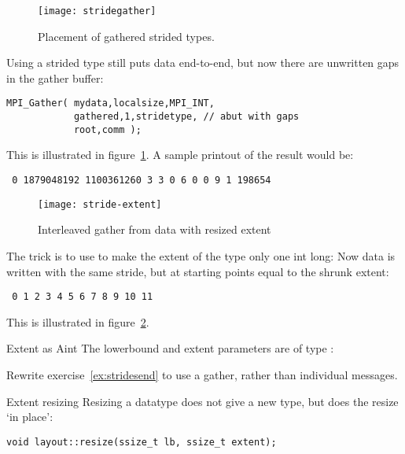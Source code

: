 \begin{figure}
  \texttt{[image: stridegather]}
  \caption{Placement of gathered strided types.}
  \label{fig:stridegather}
\end{figure}
Using a strided type still puts data end-to-end, but now there
are unwritten gaps in the gather buffer:
\begin{lstlisting}
MPI_Gather( mydata,localsize,MPI_INT,
            gathered,1,stridetype, // abut with gaps
            root,comm );  
\end{lstlisting}
This is illustrated in figure~\ref{fig:stridegather}.
A sample printout of the result would be:
\begin{verbatim}
 0 1879048192 1100361260 3 3 0 6 0 0 9 1 198654
\end{verbatim}

\begin{figure}[ht]
  \texttt{[image: stride-extent]}
  \caption{Interleaved gather from data with resized extent}
  \label{fig:stride-extent}
\end{figure}

The trick is to use 
to make the extent of the type only one int long:
%
%
Now data is written with the same stride, but
at starting points equal to the shrunk extent:
\begin{verbatim}
 0 1 2 3 4 5 6 7 8 9 10 11
\end{verbatim}

This is illustrated in figure~\ref{fig:stride-extent}.

\begin{fortrannote}{Extent as Aint}
  The lowerbound and extent parameters are of type
  :
\end{fortrannote}

\begin{exercise}[stridesend]
  \label{ex:stridesendsized}
  Rewrite exercise~\ref{ex:stridesend} to use a gather,
  rather than individual messages.
\end{exercise}

\begin{mplnote}{Extent resizing}
  Resizing a datatype does not give a new type, but
  does the resize `in place':
\begin{lstlisting}
void layout::resize(ssize_t lb, ssize_t extent);
\end{lstlisting}
\end{mplnote}

